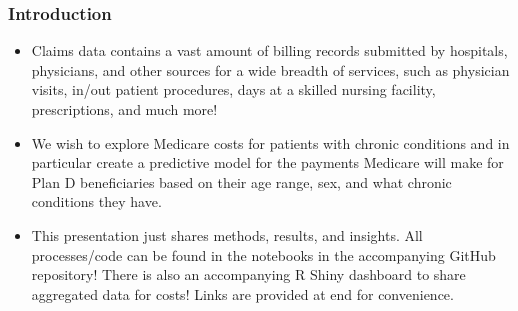 \documentclass{beamer}
\begin{document}
















\begin{frame}
\frametitle{Introduction}

\begin{itemize}

\item Claims data contains a vast amount of billing records submitted by hospitals, physicians, and other sources for a wide breadth of services, such as physician visits, in/out patient procedures, days at a skilled nursing facility, prescriptions, and much more!

\bigskip

\item We wish to explore Medicare costs for patients with chronic conditions and in particular create a predictive model for the payments Medicare will make for Plan D beneficiaries based on their age range, sex, and what chronic conditions they have.

\bigskip

\item This presentation just shares methods, results, and insights. All processes/code can be found in the notebooks in the accompanying GitHub repository! There is also an accompanying R Shiny dashboard to share aggregated data for costs! Links are provided at end for convenience.

\end{itemize}


\end{frame}
\end{document}
